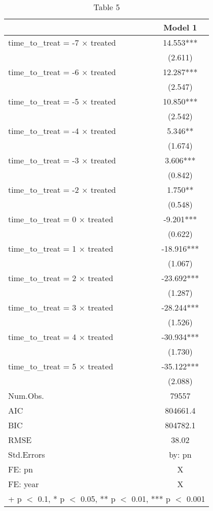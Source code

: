 \begin{table}

\caption{Table 5}
\centering
\begin{tabular}[t]{lc}
\toprule
  & Model 1\\
\midrule
time\_to\_treat = -7 × treated & 14.553***\\
 & (2.611)\\
time\_to\_treat = -6 × treated & 12.287***\\
 & (2.547)\\
time\_to\_treat = -5 × treated & 10.850***\\
 & (2.542)\\
time\_to\_treat = -4 × treated & 5.346**\\
 & (1.674)\\
time\_to\_treat = -3 × treated & 3.606***\\
 & (0.842)\\
time\_to\_treat = -2 × treated & 1.750**\\
 & (0.548)\\
time\_to\_treat = 0 × treated & -9.201***\\
 & (0.622)\\
time\_to\_treat = 1 × treated & -18.916***\\
 & (1.067)\\
time\_to\_treat = 2 × treated & -23.692***\\
 & (1.287)\\
time\_to\_treat = 3 × treated & -28.244***\\
 & (1.526)\\
time\_to\_treat = 4 × treated & -30.934***\\
 & (1.730)\\
time\_to\_treat = 5 × treated & -35.122***\\
 & (2.088)\\
\midrule
Num.Obs. & 79557\\
AIC & 804661.4\\
BIC & 804782.1\\
RMSE & 38.02\\
Std.Errors & by: pn\\
FE: pn & X\\
FE: year & X\\
\bottomrule
\multicolumn{2}{l}{\rule{0pt}{1em}+ p $<$ 0.1, * p $<$ 0.05, ** p $<$ 0.01, *** p $<$ 0.001}\\
\end{tabular}
\end{table}
